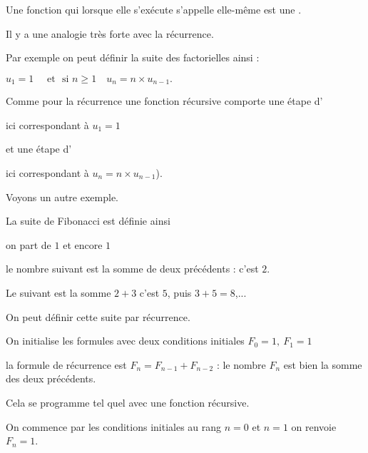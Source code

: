 \diapo

Une fonction qui lorsque elle s’exécute s'appelle elle-même est une .

\change

Il y a une analogie très forte avec la récurrence.

\change

Par exemple on peut définir la suite des factorielles ainsi :

\change

$u_1 = 1 \quad \text{ et } \text{ si } n \ge 1 \quad u_{n} = n \times u_{n-1} .$

\change


Comme pour la récurrence une fonction récursive comporte une étape d'

\change

ici  correspondant à $u_1=1$


\change

et une étape d' 

\change

ici  correspondant à $u_{n} = n \times u_{n-1}$). 





\diapo

Voyons un autre exemple.

La suite de Fibonacci est définie ainsi

on part de $1$ et encore $1$

le nombre suivant est la somme de deux précédents : c'est $2$.

Le suivant est la somme $2 + 3$ c'est $5$, puis $3+5=8$,...

\change

On peut définir cette suite par récurrence.

On initialise les formules avec deux conditions initiales $F_0 = 1, \ F_1 = 1$

la formule de récurrence est $F_{n} = F_{n-1} + F_{n-2}$ : le nombre $F_n$ est bien la somme des deux précédents.

\change

Cela se programme tel quel avec une fonction récursive.

On commence par les conditions initiales au rang $n=0$ et $n=1$ on
renvoie $F_n = 1$.

